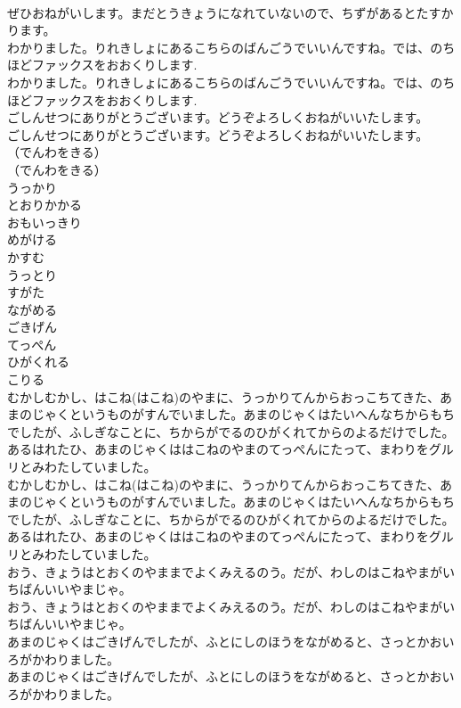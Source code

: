 \documentclass[8pt]{extreport}
\begin{document}
\begin{CJK}{UTF8}{min}
\\	ぜひおねがいします。まだとうきょうになれていないので、ちずがあるとたすかります。 
\\	わかりました。りれきしょにあるこちらのばんごうでいいんですね。では、のちほどファックスをおおくりします.	
\\	わかりました。りれきしょにあるこちらのばんごうでいいんですね。では、のちほどファックスをおおくりします. 
\\	ごしんせつにありがとうございます。どうぞよろしくおねがいいたします。	
\\	ごしんせつにありがとうございます。どうぞよろしくおねがいいたします。 
\\	（でんわをきる）	
\\	（でんわをきる） 
\\	うっかり
\\	とおりかかる
\\	おもいっきり
\\	めがける
\\	かすむ
\\	うっとり
\\	すがた
\\	ながめる
\\	ごきげん
\\	てっぺん
\\	ひがくれる
\\	こりる
\\	むかしむかし、はこね(はこね)のやまに、うっかりてんからおっこちてきた、あまのじゃくというものがすんでいました。あまのじゃくはたいへんなちからもちでしたが、ふしぎなことに、ちからがでるのひがくれてからのよるだけでした。あるはれたひ、あまのじゃくははこねのやまのてっぺんにたって、まわりをグルリとみわたしていました。	
\\	むかしむかし、はこね(はこね)のやまに、うっかりてんからおっこちてきた、あまのじゃくというものがすんでいました。あまのじゃくはたいへんなちからもちでしたが、ふしぎなことに、ちからがでるのひがくれてからのよるだけでした。あるはれたひ、あまのじゃくははこねのやまのてっぺんにたって、まわりをグルリとみわたしていました。 
\\	おう、きょうはとおくのやままでよくみえるのう。だが、わしのはこねやまがいちばんいいやまじゃ。	
\\	おう、きょうはとおくのやままでよくみえるのう。だが、わしのはこねやまがいちばんいいやまじゃ。 
\\	あまのじゃくはごきげんでしたが、ふとにしのほうをながめると、さっとかおいろがかわりました。	
\\	あまのじゃくはごきげんでしたが、ふとにしのほうをながめると、さっとかおいろがかわりました。 

\end{CJK}
\end{document}
